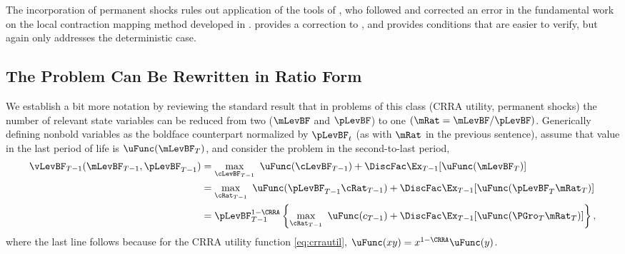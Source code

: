 \documentclass[BufferStockTheory]{subfiles}
\begin{document}
The incorporation of permanent shocks rules out application of the tools of \cite{mnUnique}, who followed and corrected an error in the fundamental work on the local contraction mapping method developed in \cite{rrExistence}.  \cite{mvExistence} provides a correction to \cite{rrExistence}, and provides conditions that are easier to verify, but again only addresses the deterministic case.  

\hypertarget{The-Problem-Can-Be-Rewritten-in-Ratio-Form}{}
\subsection{The Problem Can Be Rewritten in Ratio Form}

\label{subsec:ratio}

We establish a bit more notation by reviewing the standard result that in problems of this class (CRRA utility, permanent shocks) the number of relevant state variables can be reduced from two ($\mLevBF$ and $\pLevBF$) to one $(\mRat = \mLevBF/\pLevBF)$.  Generically defining nonbold variables as the boldface counterpart normalized by $\pLevBF_{t}$ (as with $\mRat$ in the previous sentence), assume that value in the last period of life is $\uFunc(\mLevBF_{T})$, and consider the problem in the second-to-last period,
\begin{align}
  \vLevBF_{T-1}(\mLevBF_{T-1},\pLevBF_{T-1})  & = 
                                                \max_{\cLevBF_{T-1}}~ \uFunc(\cLevBF_{T-1}) +\DiscFac \Ex_{T-1} [ \uFunc(\mLevBF_{T})]
                                                \notag \\
                                              & =  \max_{\cRat_{T-1}}~
                                                \uFunc(\pLevBF_{T-1}\cRat_{T-1}) + \DiscFac  \Ex_{T-1} [\uFunc(\pLevBF_{T}{\mRat}
                                                _{T})]  \notag \\
                                              & = \pLevBF_{T-1}^{1-\CRRA}
                                                \left\{\max_{\cRat_{T-1}}~ \uFunc(c_{T-1}) + \DiscFac \Ex_{T-1} [ \uFunc( {\PGro}_{T}
                                                {\mRat}_{T}) ] \right\},   \label{eq:vBold}
\end{align}
where the last line follows because for the CRRA utility function \eqref{eq:crrautil}, $\uFunc(xy) =
x^{1-\CRRA}\uFunc(y)$.
\end{document}
